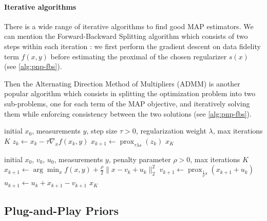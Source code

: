 \paragraph{Iterative algorithms} There is a wide range of iterative algorithms to find good MAP estimators. We can mention the Forward-Backward Splitting algorithm which consists of two steps within each iteration : we first perform the gradient descent on data fidelity term $f(x, y)$ before estimating the proximal of the chosen regularizer $s(x)$ (see \ref{alg:pnp-fbs}).

Then the Alternating Direction Method of Multipliers (ADMM) \cite{boyd_distributed_2010} is another popular algorithm which consists in splitting the optimization problem into two sub-problems, one for each term of the MAP objective, and iteratively solving them while enforcing consistency between the two solutions (see \ref{alg:pnp-fbs}).

\begin{algorithm}
    \caption{Plug-and-Play Forward--Backward Splitting (PnP-FBS)}
    \label{alg:pnp-fbs}
    \begin{algorithmic}[1]
        \Require initial $x_0$, measurements $y$, step size $\tau>0$, regularization weight $\lambda$, max iterations $K$
            \State $z_k \gets x_k - \tau \nabla_x f(x_k,y)$
            \State $x_{k+1} \gets \operatorname{prox}_{\tau\lambda s}(z_k)$ 
        \EndFor
        \Ensure $x_K$
    \end{algorithmic}
\end{algorithm}
\begin{algorithm}
    \caption{Plug-and-Play ADMM (PnP-ADMM)}
    \label{alg:pnp-admm}
    \begin{algorithmic}[1]
        \Require initial $x_0$, $v_0$, $u_0$, measurements $y$, penalty parameter $\rho>0$, max iterations $K$
            \State $x_{k+1} \gets \arg \min_x f(x,y) + \frac{\rho}{2} \|x - v_k + u_k\|_2^2$
            \State $v_{k+1} \gets \operatorname{prox}_{\frac{1}{\rho} s}(x_{k+1} + u_k)$ 
            \State $u_{k+1} \gets u_k + x_{k+1} - v_{k+1}$
        \EndFor
        \Ensure $x_K$
    \end{algorithmic}
\end{algorithm}


\subsection{Plug-and-Play Priors}

